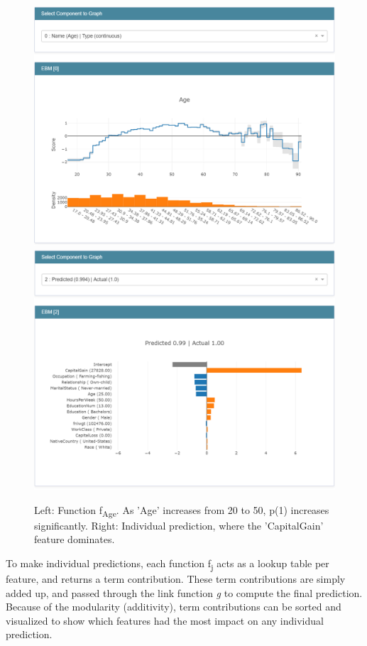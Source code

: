 \documentclass[twoside,11pt]{article}
\begin{document}
\begin{figure}[ht]
    \centering
    \includegraphics[scale=0.25]{images/ebm_global_age.PNG}
    \includegraphics[scale=0.25]{images/ebm_local.PNG}
    \caption{Left: Function f\textsubscript{Age}. As 'Age' increases from 20 to 50, p(1) increases significantly.
    Right: Individual prediction, where the 'CapitalGain' feature dominates.}
    \label{fig:ebmglobal}
\end{figure}

To make individual predictions, each function f\textsubscript{j} acts as a lookup table per feature, and returns a term contribution. These term contributions are simply added up, and passed through the link function \textit{g} to compute the final prediction. Because of the modularity (additivity), term contributions can be sorted and visualized to show which features had the most impact on any individual prediction. 
\end{document}
